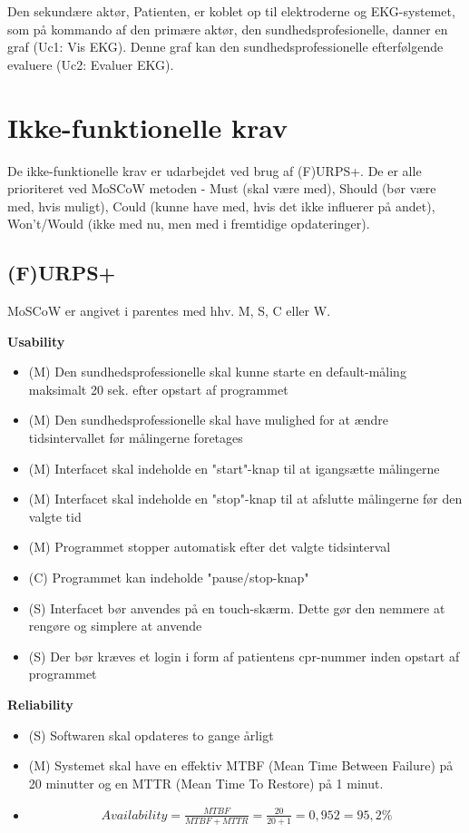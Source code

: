 Den sekundære aktør, Patienten, er koblet op til elektroderne og EKG-systemet, som på kommando af den primære aktør, den sundhedsprofesionelle, danner en graf (Uc1: Vis EKG). Denne graf kan den sundhedsprofessionelle efterfølgende evaluere (Uc2: Evaluer EKG).

\section{Ikke-funktionelle krav}
De ikke-funktionelle krav er udarbejdet ved brug af (F)URPS+. De er alle prioriteret ved MoSCoW metoden - Must (skal være med), Should (bør være med, hvis muligt), Could (kunne have med, hvis det ikke influerer på andet), Won't/Would (ikke med nu, men med i fremtidige opdateringer). 

\subsection{(F)URPS+}
MoSCoW er angivet i parentes med hhv. M, S, C eller W.

\textbf{Usability}
\begin{itemize}
	\item (M) Den sundhedsprofessionelle skal kunne starte en default-måling maksimalt 20 sek. efter opstart af programmet
	\item (M) Den sundhedsprofessionelle skal have mulighed for at ændre tidsintervallet før målingerne foretages
	\item (M) Interfacet skal indeholde en "start"-knap til at igangsætte målingerne
	\item (M) Interfacet skal indeholde en "stop"-knap til at afslutte målingerne før den valgte tid
	\item (M) Programmet stopper automatisk efter det valgte tidsinterval
	\item (C) Programmet kan indeholde "pause/stop-knap"
	\item (S) Interfacet bør anvendes på en touch-skærm. Dette gør den nemmere at rengøre og simplere at anvende
	\item (S) Der bør kræves et login i form af patientens cpr-nummer inden opstart af programmet
\end{itemize}

\textbf{Reliability}
\begin{itemize}
	\item (S) Softwaren skal opdateres to gange årligt
	\item (M) Systemet skal have en effektiv MTBF (Mean Time Between Failure) på 20 minutter og en MTTR (Mean Time To Restore) på 1 minut.
	\item  
				\begin{align}
					Availability = \frac{MTBF}{MTBF+MTTR} = \frac{20}{20+1} = 0,952 = 95,2 \%
				\end{align}

\end{itemize}

